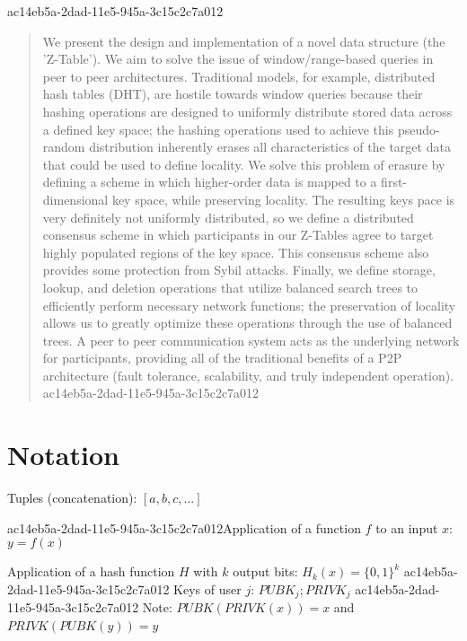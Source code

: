 \documentclass[12pt]{article}
\begin{document}
ac14eb5a-2dad-11e5-945a-3c15c2c7a012\maketitle

\begin{abstract}
We present the design and implementation of a novel data structure (the 'Z-Table'). We aim to solve the issue of window/range-based queries in peer to peer architectures. Traditional models, for example,  distributed hash tables (DHT), are hostile towards window queries because their hashing operations are designed to uniformly distribute stored data across a defined key space; the hashing operations used to achieve this pseudo-random distribution inherently erases all characteristics of the target data that could be used to define locality. We solve this problem of erasure by defining a scheme in which higher-order data is mapped to a first-dimensional key space, while preserving locality. The resulting keys pace is very definitely not uniformly distributed, so we define a distributed consensus scheme in which participants in our Z-Tables agree to target highly populated regions of the key space. This consensus scheme also provides some protection from Sybil attacks. Finally, we define storage, lookup, and deletion operations that utilize balanced search trees to efficiently perform necessary network functions; the preservation of locality allows us to greatly optimize these operations through the use of balanced trees. A peer to peer communication system acts as the underlying network for participants, providing all of the traditional benefits of a P2P architecture (fault tolerance, scalability, and truly independent operation).
ac14eb5a-2dad-11e5-945a-3c15c2c7a012\end{abstract}

\section{Notation}

Tuples (concatenation): $[a,b,c,...]$

ac14eb5a-2dad-11e5-945a-3c15c2c7a012Application of a function $f$ to an input $x$: $y=f(x)$

Application of a hash function $H$ with $k$ output bits: $H_{k}(x) = \{0,1\}^k$
ac14eb5a-2dad-11e5-945a-3c15c2c7a012
Keys of user $j$: $ PUBK_j; PRIVK_j $
ac14eb5a-2dad-11e5-945a-3c15c2c7a012
Note: $PUBK(PRIVK(x)) = x$ and $PRIVK(PUBK(y)) = y$~
\end{document}
